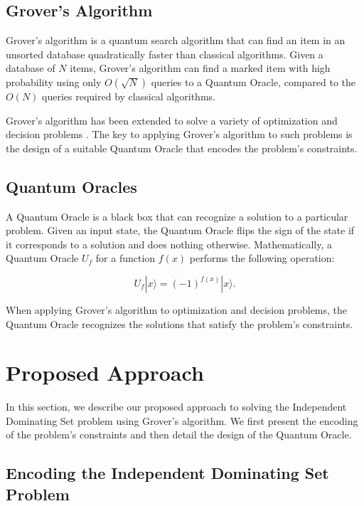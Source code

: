\subsection{Grover's Algorithm}

Grover's algorithm \cite{Grover1996} is a quantum search algorithm that can find an item in an unsorted database quadratically faster than classical algorithms. Given a database of $N$ items, Grover's algorithm can find a marked item with high probability using only $O(\sqrt{N})$ queries to a Quantum Oracle, compared to the $O(N)$ queries required by classical algorithms.

Grover's algorithm has been extended to solve a variety of optimization and decision problems \cite{Durr1996, Montanaro2015}. The key to applying Grover's algorithm to such problems is the design of a suitable Quantum Oracle that encodes the problem's constraints.

\subsection{Quantum Oracles}

A Quantum Oracle is a black box that can recognize a solution to a particular problem. Given an input state, the Quantum Oracle flips the sign of the state if it corresponds to a solution and does nothing otherwise. Mathematically, a Quantum Oracle $U_f$ for a function $f(x)$ performs the following operation:

\begin{equation}
    U_f |x\rangle = (-1)^{f(x)} |x\rangle.
\end{equation}

When applying Grover's algorithm to optimization and decision problems, the Quantum Oracle recognizes the solutions that satisfy the problem's constraints.

\section{Proposed Approach}
\label{sec:approach}

In this section, we describe our proposed approach to solving the Independent Dominating Set problem using Grover's algorithm. We first present the encoding of the problem's constraints and then detail the design of the Quantum Oracle.

\subsection{Encoding the Independent Dominating Set Problem}

